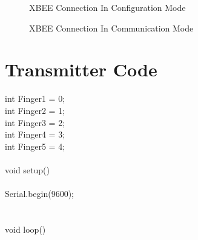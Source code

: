 \documentclass[a4paper, 12pt, notitlepage]{report}
\begin{document}
\begin{figure}[h!]
{\par}
\caption{XBEE Connection In Configuration Mode}
\end{figure}

\begin{figure}[h!]
{\par}
\caption{XBEE Connection In Communication Mode}
\end{figure}
\newpage

\section{Transmitter Code}
int Finger1 = 0;\\
int Finger2 = 1;\\
int Finger3 = 2;\\
int Finger4 = 3;\\
int Finger5 = 4;\\
\\
void setup()\\
{\\
Serial.begin(9600);\\
}\\
\\
void loop()\\
\end{document}
